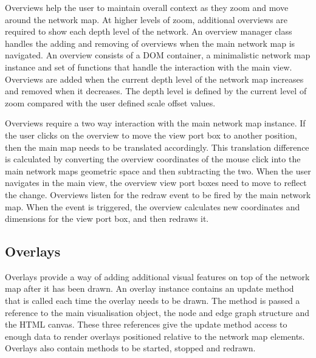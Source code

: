 \documentclass[11pt, a4paper]{article}
\begin{document}
Overviews help the user to maintain overall context as they zoom and move around
the network map. At higher levels of zoom, additional overviews are required to
show each depth level of the network. An overview manager class handles the
adding and removing of overviews when the main network map is navigated. An
overview consists of a DOM container, a minimalistic network map instance and set
of functions that handle the interaction with the main view. Overviews are added
when the current depth level of the network map increases and removed when it
decreases. The depth level is defined by the current level of zoom compared with
the user defined scale offset values.

Overviews require a two way interaction with the main network map instance. If
the user clicks on the overview to move the view port box to another position,
then the main map needs to be translated accordingly. This translation
difference is calculated by converting the overview coordinates of the mouse
click into the main network maps geometric space and then subtracting the two.
When the user navigates in the main view, the overview view port boxes need to
move to reflect the change. Overviews listen for the redraw event to be fired by
the main network map. When the event is triggered, the overview calculates new
coordinates and dimensions for the view port box, and then redraws it.


\subsection{Overlays}
\label{sec:overlays.impl}

Overlays provide a way of adding additional visual features on top of the
network map after it has been drawn. An overlay instance contains an update
method that is called each time the overlay needs to be drawn. The method is
passed a reference to the main visualisation object, the node and edge graph
structure and the HTML canvas. These three references give the update method
access to enough data to render overlays positioned relative to the network map
elements. Overlays also contain methods to be started, stopped and redrawn.
\end{document}
